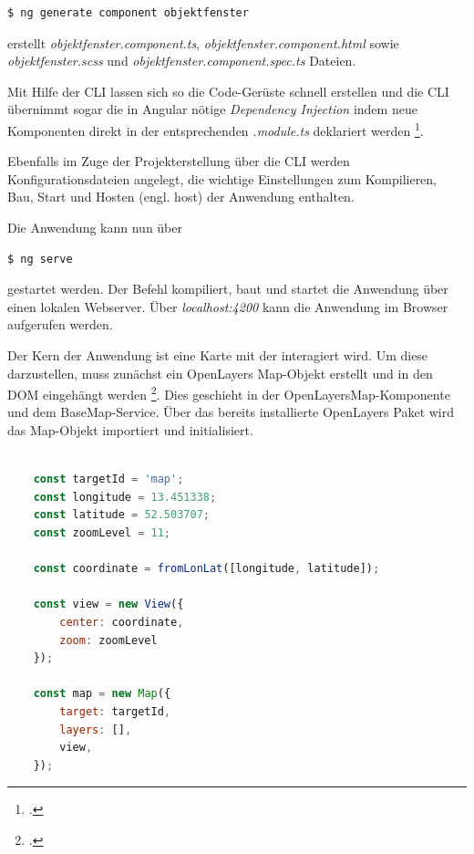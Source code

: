 \begin{lstlisting}[language=bash, caption={Erstellen der Objektfensterkomponente}]
$ ng generate component objektfenster
\end{lstlisting}

erstellt \emph{objektfenster.component.ts}, \emph{objektfenster.component.html} sowie \emph{objektfenster.scss} und \emph{objektfenster.component.spec.ts} Dateien.

Mit Hilfe der CLI lassen sich so die Code-Gerüste schnell erstellen und die CLI übernimmt sogar die in Angular nötige \emph{Dependency Injection} indem neue Komponenten direkt in der entsprechenden \emph{.module.ts} deklariert werden \footcite{angular_cli}.

Ebenfalls im Zuge der Projekterstellung über die CLI werden Konfigurationsdateien angelegt, die wichtige Einstellungen zum Kompilieren, Bau, Start und Hosten (engl. host) der Anwendung enthalten.

Die Anwendung kann nun über 

\begin{lstlisting}[language=bash, caption={Starten der Anwendung}]
	$ ng serve
\end{lstlisting}

gestartet werden.
Der Befehl kompiliert, baut und startet die Anwendung über einen lokalen Webserver.
Über \emph{localhost:4200} kann die Anwendung im Browser aufgerufen werden.

Der Kern der Anwendung ist eine Karte mit der interagiert wird.
Um diese darzustellen, muss zunächst ein OpenLayers Map-Objekt erstellt und in den DOM eingehängt werden \footcite{openlayers_map}.
Dies geschieht in der OpenLayersMap-Komponente und dem BaseMap-Service.
Über das bereits installierte OpenLayers Paket wird das Map-Objekt importiert und initialisiert.

\begin{lstlisting}[language=JavaScript, caption={Erstellung der Karte}]

	const targetId = 'map';
	const longitude = 13.451338;
	const latitude = 52.503707;
	const zoomLevel = 11;
	
	const coordinate = fromLonLat([longitude, latitude]);
	
	const view = new View({
		center: coordinate,
		zoom: zoomLevel
	});
	
	const map = new Map({
		target: targetId,
		layers: [],
		view,
	});


\end{lstlisting}

